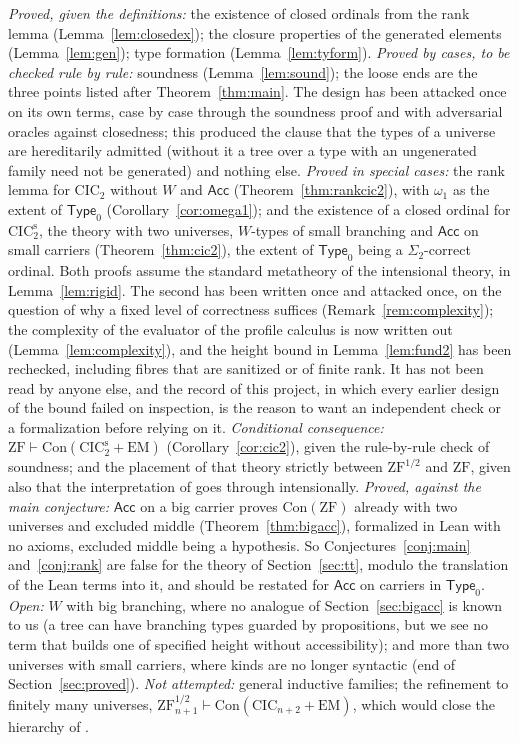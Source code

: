 \documentclass[10pt]{article}
\newcommand{\Type}{\mathsf{Type}}
\newcommand{\CIC}{\mathrm{CIC}}
\newcommand{\ZF}{\mathrm{ZF}}
\newcommand{\ZFh}{\mathrm{ZF}^{1/2}}
\newcommand{\EM}{\mathrm{EM}}
\newcommand{\Con}{\mathrm{Con}}
\newcommand{\Acc}{\mathsf{Acc}}
\begin{document}
\emph{Proved, given the definitions:} the existence of closed ordinals
from the rank lemma (Lemma~\ref{lem:closedex}); the closure properties of
the generated elements (Lemma~\ref{lem:gen}); type formation
(Lemma~\ref{lem:tyform}). \emph{Proved by cases, to be checked rule by
rule:} soundness (Lemma~\ref{lem:sound}); the loose ends are the three
points listed after Theorem~\ref{thm:main}. The design has been
attacked once on its own terms, case by case through the soundness
proof and with adversarial oracles against closedness; this produced
the clause that the types of a universe are hereditarily admitted
(without it a tree over a type with an ungenerated family need not be
generated) and nothing else.
\emph{Proved in special cases:} the rank lemma for $\CIC_2$ without $W$
and $\Acc$ (Theorem~\ref{thm:rankcic2}), with $\omega_1$ as the extent of
$\Type_0$ (Corollary~\ref{cor:omega1}); and the existence of a closed
ordinal for $\CIC_2^{\mathrm s}$, the theory with two universes,
$W$-types of small branching and $\Acc$ on small carriers
(Theorem~\ref{thm:cic2}), the extent of $\Type_0$ being a
$\Sigma_2$-correct ordinal. Both proofs assume the standard metatheory of
the intensional theory, in Lemma~\ref{lem:rigid}. The second has been
written once and attacked once, on the question of why a fixed level of
correctness suffices (Remark~\ref{rem:complexity}); the complexity of the
evaluator of the profile calculus is now written out
(Lemma~\ref{lem:complexity}), and the height bound in
Lemma~\ref{lem:fund2} has been rechecked, including fibres that are
sanitized or of finite rank. It has not been read by anyone else, and
the record of this project, in which every earlier design of the bound
failed on inspection, is the reason to want an independent check or a
formalization before relying on it.
\emph{Conditional consequence:} $\ZF\vdash\Con(\CIC_2^{\mathrm s}+\EM)$
(Corollary~\ref{cor:cic2}), given the rule-by-rule check of soundness; and
the placement of that theory strictly between $\ZFh$ and $\ZF$, given
also that the interpretation of \cite{paper2} goes through
intensionally.
\emph{Proved, against the main conjecture:} $\Acc$ on a big carrier
proves $\Con(\ZF)$ already with two universes and excluded middle
(Theorem~\ref{thm:bigacc}), formalized in Lean with no axioms, excluded
middle being a hypothesis. So Conjectures~\ref{conj:main}
and~\ref{conj:rank} are false for the theory of Section~\ref{sec:tt},
modulo the translation of the Lean terms into it, and should be
restated for
$\Acc$ on carriers in $\Type_0$.
\emph{Open:} $W$ with big branching, where no analogue of
Section~\ref{sec:bigacc} is known to us (a tree can have branching
types guarded by propositions, but we see no term that builds one of
specified height without accessibility); and more than two universes with
small carriers, where kinds are no longer syntactic (end of
Section~\ref{sec:proved}).
\emph{Not attempted:} general inductive families; the refinement to
finitely many universes, $\ZFh_{n+1}\vdash\Con(\CIC_{n+2}+\EM)$, which
would close the hierarchy of \cite{paper2}.
\end{document}
